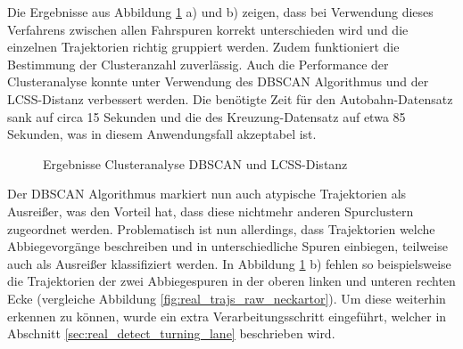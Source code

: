Die Ergebnisse aus Abbildung \ref{fig:real_results_dbscan_lcss} a) und b) zeigen, dass bei Verwendung
dieses Verfahrens zwischen allen Fahrspuren korrekt unterschieden wird und die einzelnen Trajektorien
richtig gruppiert werden. Zudem funktioniert die Bestimmung der Clusteranzahl zuverlässig.
Auch die Performance der Clusteranalyse konnte unter Verwendung des DBSCAN Algorithmus und der LCSS-Distanz
verbessert werden. Die benötigte Zeit für den Autobahn-Datensatz sank auf circa 15 Sekunden und die des
Kreuzung-Datensatz auf etwa 85 Sekunden, was in diesem Anwendungsfall akzeptabel ist.

\begin{figure}[H]
    \centering
    \qquad \qquad
    \caption{Ergebnisse Clusteranalyse DBSCAN und LCSS-Distanz}
    \label{fig:real_results_dbscan_lcss}
\end{figure}

Der DBSCAN Algorithmus markiert nun auch atypische Trajektorien als Ausreißer, was den Vorteil hat, dass
diese nichtmehr anderen Spurclustern zugeordnet werden. Problematisch ist nun allerdings, dass Trajektorien
welche Abbiegevorgänge beschreiben und in unterschiedliche Spuren einbiegen, teilweise auch als Ausreißer
klassifiziert werden. In Abbildung \ref{fig:real_results_dbscan_lcss} b) fehlen so beispielsweise die Trajektorien
der zwei Abbiegespuren in der oberen linken und unteren rechten Ecke (vergleiche Abbildung \ref{fig:real_trajs_raw_neckartor}).
Um diese weiterhin erkennen zu können, wurde ein extra Verarbeitungsschritt eingeführt, welcher in Abschnitt
\ref{sec:real_detect_turning_lane} beschrieben wird.

